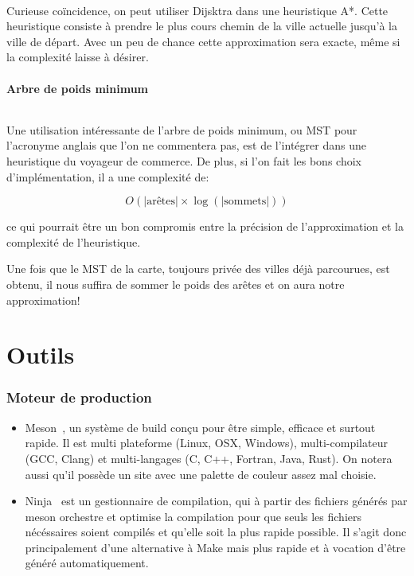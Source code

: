 \documentclass[french]{article}
\begin{document}
\paragraph{} Curieuse coïncidence, on peut utiliser Dijsktra dans une
heuristique A*. Cette heuristique consiste à prendre le plus cours chemin de la
ville actuelle jusqu'à la ville de départ. Avec un peu de chance cette
approximation sera exacte, même si la complexité laisse à désirer.

\subsection{Arbre de poids minimum}

\paragraph{} Une utilisation intéressante de l'arbre de poids minimum, ou MST
pour l'acronyme anglais que l'on ne commentera pas, est de l'intégrer dans une
heuristique du voyageur de commerce. De plus, si l'on fait les bons choix
d'implémentation, il a une complexité de:

\[O(|\text{arêtes}| \times \log\left(|\text{sommets}|\right))\]

ce qui pourrait être un bon compromis entre la précision de l'approximation et
la complexité de l'heuristique.

Une fois que le MST de la carte, toujours privée des villes déjà parcourues,
est obtenu, il nous suffira de sommer le poids des arêtes et on aura notre
approximation!

\part{Outils}

\section{Moteur de production}

\begin{itemize}
	\item Meson~\cite{tools:meson}, un système de build conçu pour être simple,
		efficace et surtout rapide. Il est multi plateforme (Linux, OSX,
		Windows), multi-compilateur (GCC, Clang) et multi-langages (C, C++,
		Fortran, Java, Rust). On notera aussi qu'il possède un site avec une
		palette de couleur assez mal choisie.

	\item Ninja~\cite{tools:ninja} est un gestionnaire de compilation, qui à
		partir des fichiers générés par meson orchestre et optimise la
		compilation pour que seuls les fichiers nécéssaires soient compilés et
		qu'elle soit la plus rapide possible. Il s'agit donc principalement
		d'une alternative à Make mais plus rapide et à vocation d'être généré
		automatiquement.
\end{itemize}
\end{document}
